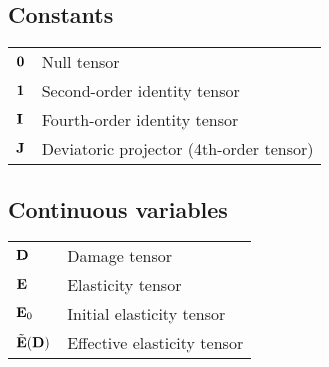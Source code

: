 {        \subsection*{Constants}%
        \label{sec:Constants}
        \vspace{-1em}
        \begin{longtable}{p{} p{}}
            \( \mathbf{0} \)             & Null tensor                                                                           \\[0.5em]
            \( \id{2} \)            & Second-order identity tensor                                                          \\[0.5em]
            \( \id{4} \)            & Fourth-order identity tensor                                                          \\[0.5em]
            \( \mathbf{J} \)                & Deviatoric projector (4th-order tensor)                                               \\[0.5em]
        \end{longtable}
        \vspace{-2em}

        \subsection*{Continuous variables}%
        \label{sec:Continuous variables}
        \vspace{-1em}
        \begin{longtable}{p{} p{}}
            \( \mathbf{D} \)              & Damage tensor                                                                         \\[0.5em]
            \( \mathbf{E} \)              & Elasticity tensor                                                                     \\[0.5em]
            \( \mathbf{E}_0 \)            & Initial elasticity tensor                                                             \\[0.5em]
            \( \tilde{\mathbf{E}}(\mathbf{D}) \)     & Effective elasticity tensor                                                           \\[0.5em]
        \end{longtable}
        \vspace{-2em}

}
